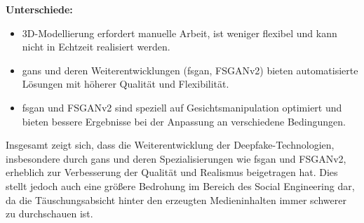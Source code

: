 \textbf{Unterschiede:}
\begin{itemize}
    \item 3D-Modellierung erfordert manuelle Arbeit, ist weniger flexibel und kann nicht in Echtzeit realisiert werden.
    \item \glspl{gan} und deren Weiterentwicklungen (\gls{fsgan}, FSGANv2) bieten automatisierte Lösungen mit höherer Qualität und Flexibilität.
    \item \gls{fsgan} und FSGANv2 sind speziell auf Gesichtsmanipulation optimiert und bieten bessere Ergebnisse bei der Anpassung an verschiedene Bedingungen\cite{Deepfakes-a-survey-and-introduction-to-the-topical-collection}.
\end{itemize}

Insgesamt zeigt sich, dass die Weiterentwicklung der Deepfake-Technologien, insbesondere durch \glspl{gan} und deren Spezialisierungen wie \gls{fsgan} und FSGANv2, erheblich zur Verbesserung der Qualität und Realismus beigetragen hat.
Dies stellt jedoch auch eine größere Bedrohung im Bereich des Social Engineering dar, da die Täuschungsabsicht hinter den erzeugten Medieninhalten immer schwerer zu durchschauen ist.

